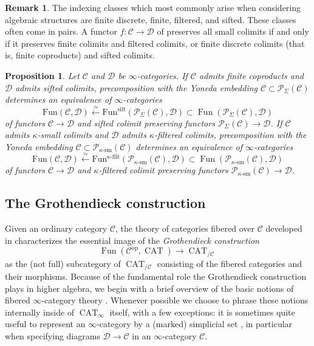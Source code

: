 \documentclass{article}
\newtheorem{proposition}{Proposition}[subsection]
\theoremstyle{definition}
\newtheorem{remark}{Remark}[subsection]
\newcommand{\C}{\mathcal{C}}
\newcommand{\D}{\mathcal{D}}
\renewcommand{\P}{\mathcal{P}}
\renewcommand{\i}{\infty}
\newcommand{\too}{\longrightarrow}
\newcommand{\from}{\longleftarrow}
\newcommand{\op}{\mathrm{op}}
\DeclareMathOperator{\CAT}{CAT}
\DeclareMathOperator{\Fun}{Fun}
\begin{document}
\begin{remark}
The indexing classes which most commonly arise when considering algebraic structures are finite discrete, finite, filtered, and sifted.
These classes often come in pairs.
A functor $f:\C\to\D$ of preserves all small colimits if and only if it preserves finite colimits and filtered colimits, or finite discrete colimits (that is, finite coproducts) and sifted colimits.
\end{remark}


\begin{proposition}{\em \cite[Proposition 5.3.6.2]{HTT}}\label{prop:fc}
Let ${\mathcal{C}}$ and $\D$ be ${\infty}$-categories.
If $\C$ admits finite coproducts and ${\mathcal{D}}$ admits sifted colimits, precomposition with the Yoneda embedding $\C\subset\P_\Sigma(\C)$ determines an equivalence of $\i$-categories
\[
\mathrm{Fun}(\mathcal{C}, \mathcal{D})\overset{\simeq}{\from}\mathrm{Fun^{\mathrm{sift}}}(\P_\Sigma(\C), \mathcal{D}) \subset\Fun(\P_\Sigma(\C),\D)
\]
of functors $\C\to\D$ and sifted colimit preserving functors ${\P_\Sigma(\C) \rightarrow \mathcal{D}}$.
If $\C$ admits $\kappa$-small colimits and $\D$ admits $\kappa$-filtered colimits, precomposition with the Yoneda embedding $\C\subset\P_{\kappa\textrm{-}\mathrm{sm}}(\C)$ determines an equivalence of $\i$-categories
\[
\mathrm{Fun}(\mathcal{C}, \mathcal{D})\overset{\simeq}{\from}\mathrm{Fun^{\kappa\textrm{-}\mathrm{filt}}}(\P_{\kappa\textrm{-}\mathrm{sm}}(\C), \mathcal{D}) \subset\Fun(\P_{\kappa\textrm{-}\mathrm{sm}}(\C),\D)
\]
of functors $\C\to\D$ and $\kappa$-filtered colimit preserving functors ${\P_{\kappa\textrm{-}\mathrm{sm}}(\C) \rightarrow \mathcal{D}}$.
\end{proposition}


\subsection{The Grothendieck construction}\label{sec:GC}

Given an ordinary category $\C$, the theory of categories fibered over $\C$ developed in \cite{SGA1} characterizes the essential image of the {\em Grothendieck construction}
\[
\Fun(\C^{\op},\CAT)\too\CAT_{/\C}
\]
as the (not full) subcategory of $\CAT_{/\C}$ consisting of the fibered categories and their morphisms.
Because of the fundamental role the Grothendieck construction plays in higher algebra, we begin with a brief overview of the basic notions of fibered $\i$-category theory \cite{HTT}.
Whenever possible we choose to phrase these notions internally inside of $\CAT_\i$ itself, with a few exceptions: it is sometimes quite useful to represent an $\i$-category by a (marked) simplicial set \cite{HTT}, in particular when specifying diagrams $\D\to\C$ in an $\i$-category $\C$.
\end{document}
